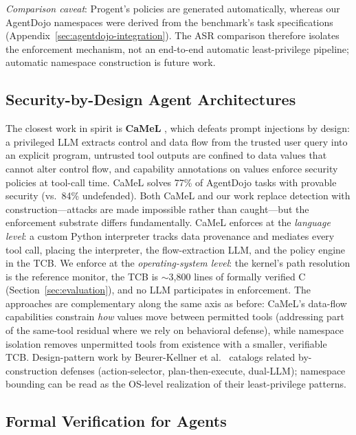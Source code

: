 \documentclass{article}
\begin{document}
\textit{Comparison caveat}: Progent's policies are generated automatically, whereas our AgentDojo namespaces were derived from the benchmark's task specifications (Appendix~\ref{sec:agentdojo-integration}). The ASR comparison therefore isolates the enforcement mechanism, not an end-to-end automatic least-privilege pipeline; automatic namespace construction is future work.

\subsection{Security-by-Design Agent Architectures}

The closest work in spirit is \textbf{CaMeL} \cite{debenedetti2025camel}, which defeats prompt injections by design: a privileged LLM extracts control and data flow from the trusted user query into an explicit program, untrusted tool outputs are confined to data values that cannot alter control flow, and capability annotations on values enforce security policies at tool-call time. CaMeL solves 77\% of AgentDojo tasks with provable security (vs.\ 84\% undefended). Both CaMeL and our work replace detection with construction---attacks are made impossible rather than caught---but the enforcement substrate differs fundamentally. CaMeL enforces at the \textit{language level}: a custom Python interpreter tracks data provenance and mediates every tool call, placing the interpreter, the flow-extraction LLM, and the policy engine in the TCB. We enforce at the \textit{operating-system level}: the kernel's path resolution is the reference monitor, the TCB is $\sim$3,800 lines of formally verified C (Section~\ref{sec:evaluation}), and no LLM participates in enforcement. The approaches are complementary along the same axis as before: CaMeL's data-flow capabilities constrain \textit{how} values move between permitted tools (addressing part of the same-tool residual where we rely on behavioral defense), while namespace isolation removes unpermitted tools from existence with a smaller, verifiable TCB. Design-pattern work by Beurer-Kellner et al.\ \cite{beurerkellner2025patterns} catalogs related by-construction defenses (action-selector, plan-then-execute, dual-LLM); namespace bounding can be read as the OS-level realization of their least-privilege patterns.

\subsection{Formal Verification for Agents}
\end{document}
